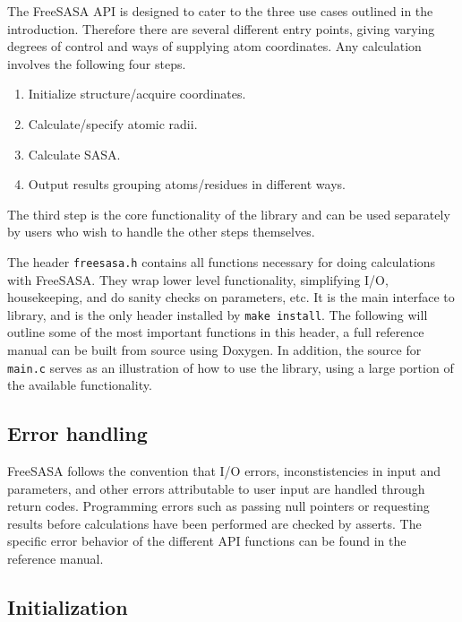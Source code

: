 \documentclass[a4paper,11pt]{article}
\begin{document}
The FreeSASA API is designed to cater to the three use cases outlined
in the introduction. Therefore there are several different entry
points, giving varying degrees of control and ways of supplying atom
coordinates. Any calculation involves the following four steps.
\begin{enumerate}
  \item Initialize structure/acquire coordinates.
  \item Calculate/specify atomic radii.
  \item Calculate SASA.
  \item Output results grouping atoms/residues in different ways.
\end{enumerate}
The third step is the core functionality of the library and can be
used separately by users who wish to handle the other steps
themselves. 

The header \texttt{freesasa.h} contains all functions necessary for
doing calculations with FreeSASA. They wrap lower level functionality,
simplifying I/O, housekeeping, and do sanity checks on parameters,
etc. It is the main interface to library, and is the only header
installed by \verb|make install|. The following will outline some of
the most important functions in this header, a full reference manual
can be built from source using Doxygen. In addition, the source for
\texttt{main.c} serves as an illustration of how to use the library,
using a large portion of the available functionality.

\subsection{Error handling}

FreeSASA follows the convention that I/O errors, inconstistencies in
input and parameters, and other errors attributable to user input are
handled through return codes. Programming errors such as passing null
pointers or requesting results before calculations have been performed
are checked by asserts. The specific error behavior of the different
API functions can be found in the reference manual.

\subsection{Initialization}
\end{document}
